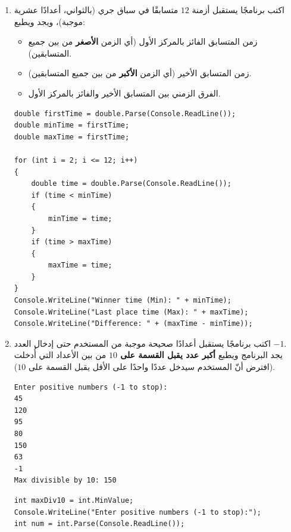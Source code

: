 \documentclass[14pt]{extarticle}
\begin{document}
\begin{enumerate}[itemsep=2em]
\item اكتب برنامجًا يستقبل أزمنة $12$ متسابقًا في سباق جري (بالثواني، أعدادًا عشرية موجبة)، ويجد ويطبع:
\begin{itemize}[nosep]
    \item زمن المتسابق الفائز بالمركز الأول (أي الزمن \textbf{الأصغر} من بين جميع المتسابقين).
    \item زمن المتسابق الأخير (أي الزمن \textbf{الأكبر} من بين جميع المتسابقين).
    \item الفرق الزمني بين المتسابق الأخير والفائز بالمركز الأول.
\end{itemize}
\ifwithsols
\begin{boxSolution}
\begin{english}
\begin{verbatim}
double firstTime = double.Parse(Console.ReadLine());
double minTime = firstTime;
double maxTime = firstTime;

for (int i = 2; i <= 12; i++)
{
    double time = double.Parse(Console.ReadLine());
    if (time < minTime)
    {
        minTime = time;
    }
    if (time > maxTime)
    {
        maxTime = time;
    }
}
Console.WriteLine("Winner time (Min): " + minTime);
Console.WriteLine("Last place time (Max): " + maxTime);
Console.WriteLine("Difference: " + (maxTime - minTime));
\end{verbatim}
\end{english}
\end{boxSolution}
\fi
\filbreak

\item اكتب برنامجًا يستقبل أعدادًا صحيحة موجبة من المستخدم حتى إدخال العدد $-1$. \\
يجد البرنامج ويطبع \textbf{أكبر عدد يقبل القسمة على $10$} من بين الأعداد التي أُدخلت (افترض أنّ المستخدم سيدخل عددًا واحدًا على الأقل يقبل القسمة على $10$).
\ifdetailed
\begin{boxExample}
\begin{english}
\begin{verbatim}
Enter positive numbers (-1 to stop):
45
120
95
80
150
63
-1
Max divisible by 10: 150
\end{verbatim}
\end{english}
\end{boxExample}
\fi
\ifwithsols
\begin{boxSolution}
\begin{english}
\begin{verbatim}
int maxDiv10 = int.MinValue;
Console.WriteLine("Enter positive numbers (-1 to stop):");
int num = int.Parse(Console.ReadLine());


\end{verbatim}
\end{english}
\end{boxSolution}
\end{enumerate}
\end{document}
